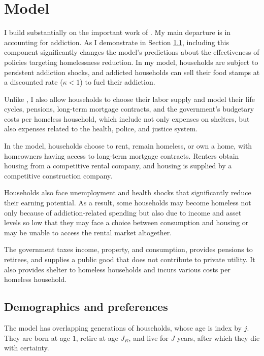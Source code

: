 \documentclass[parskip=full]{article}
\begin{document}

\section{Model}\label{sec:model}

I build substantially on the important work of \citet{az-2024}. My main departure is in accounting for addiction. As I demonstrate in Section \ref{}, including this component significantly changes the model's predictions about the effectiveness of policies targeting homelessness reduction. In my model, households are subject to persistent addiction shocks, and addicted households can sell their food stamps at a discounted rate ($\kappa<1$) to fuel their addiction.

Unlike \citet{az-2024}, I also allow households to choose their labor supply and model their life cycles, pensions, long-term mortgage contracts, and the government’s budgetary costs per homeless household, which include not only expenses on shelters, but also expenses related to the health, police, and justice system.

In the model, households choose to rent, remain homeless, or own a home, with homeowners having access to long-term mortgage contracts. Renters obtain housing from a competitive rental company, and housing is supplied by a competitive construction company.

Households also face unemployment and health shocks that significantly reduce their earning potential. As a result, some households may become homeless not only because of addiction-related spending but also due to income and asset levels so low that they may face a choice between consumption and housing or may be unable to access the rental market altogether.

The government taxes income, property, and consumption, provides pensions to retirees, and supplies a public good that does not contribute to private utility. It also provides shelter to homeless households and incurs various costs per homeless household.

\subsection{Demographics and preferences}

The model has overlapping generations of households, whose age is index by $j$. They are born at age $1$, retire at age $J_R$, and live for $J$ years, after which they die with certainty. 
\end{document}
